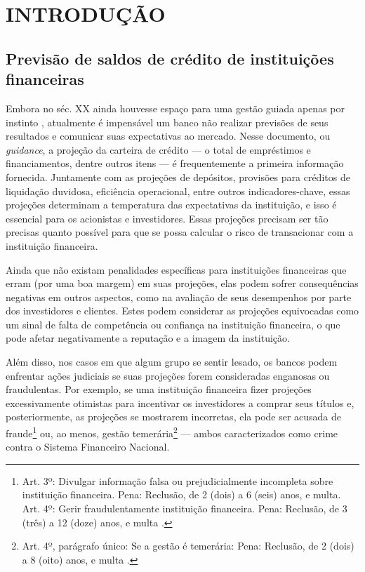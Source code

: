 \documentclass[
  12pt,
  twoside,
  openright,
  a4paper,
  chapter=TITLE,
  section=TITLE,
  brazil]{abntex2}
\renewcommand*\contentsname{Table of contents}
\newcommand\contentsname{Table of contents}
\begin{document}
\pdfbookmark[0]{\contentsname}{toc}
\tableofcontents*
\cleardoublepage

\textual
\pagestyle{simple}

\section{INTRODUÇÃO}\label{introduuxe7uxe3o}

\subsection{Previsão de saldos de crédito de instituições
financeiras}\label{previsuxe3o-de-saldos-de-cruxe9dito-de-instituiuxe7uxf5es-financeiras}

Embora no séc. XX ainda houvesse espaço para uma gestão guiada apenas
por instinto \autocite{wallander_budgeting_1999}, atualmente é
impensável um banco não realizar previsões de seus resultados e
comunicar suas expectativas ao mercado. Nesse documento, ou
\emph{guidance}, a projeção da carteira de crédito --- o total de
empréstimos e financiamentos, dentre outros itens --- é frequentemente a
primeira informação fornecida. Juntamente com as projeções de depósitos,
provisões para créditos de liquidação duvidosa, eficiência operacional,
entre outros indicadores-chave, essas projeções determinam a temperatura
das expectativas da instituição, e isso é essencial para os acionistas e
investidores. Essas projeções precisam ser tão precisas quanto possível
para que se possa calcular o risco de transacionar com a instituição
financeira.

Ainda que não existam penalidades específicas para instituições
financeiras que erram (por uma boa margem) em suas projeções, elas podem
sofrer consequências negativas em outros aspectos, como na avaliação de
seus desempenhos por parte dos investidores e clientes. Estes podem
considerar as projeções equivocadas como um sinal de falta de
competência ou confiança na instituição financeira, o que pode afetar
negativamente a reputação e a imagem da instituição.

Além disso, nos casos em que algum grupo se sentir lesado, os bancos
podem enfrentar ações judiciais se suas projeções forem consideradas
enganosas ou fraudulentas. Por exemplo, se uma instituição financeira
fizer projeções excessivamente otimistas para incentivar os investidores
a comprar seus títulos e, posteriormente, as projeções se mostrarem
incorretas, ela pode ser acusada de fraude\footnote{Art. 3º: Divulgar
  informação falsa ou prejudicialmente incompleta sobre instituição
  financeira. Pena: Reclusão, de 2 (dois) a 6 (seis) anos, e multa. Art.
  4º: Gerir fraudulentamente instituição financeira. Pena: Reclusão, de
  3 (três) a 12 (doze) anos, e multa \autocite{brasil_lei_1986}.} ou, ao
menos, gestão temerária\footnote{Art. 4º, parágrafo único: Se a gestão é
  temerária: Pena: Reclusão, de 2 (dois) a 8 (oito) anos, e multa
  \autocite{brasil_lei_1986}.} --- ambos caracterizados como crime
contra o Sistema Financeiro Nacional.
\end{document}
